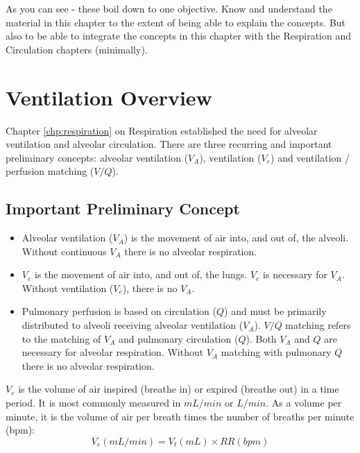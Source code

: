 As you can see - these boil down to one objective. Know and understand the material in this chapter to the extent of being able to explain the concepts. But also to be able to integrate the concepts in this chapter with the Respiration and Circulation chapters (minimally).

\section{Ventilation Overview}

Chapter \ref{chp:respiration} on Respiration established the need for alveolar ventilation and alveolar circulation. There are three recurring and important preliminary concepts: alveolar ventilation ($V_A$), ventilation ($V_e$) and ventilation / perfusion matching ($V/Q$).

\subsection{Important Preliminary Concept}

\begin{itemize}
    \item Alveolar ventilation ($V_A$) is the movement of air into, and out of, the alveoli. Without continuous $V_A$ there is no alveolar respiration. 
    \item $V_e$ is the movement of air into, and out of, the lungs. $V_e$ is necessary for $V_A$. Without ventilation ($V_e$), there is no $V_A$. \item Pulmonary perfusion is based on circulation ($Q$) and must be primarily distributed to alveoli receiving alveolar ventilation ($V_A$). $V/Q$ matching refers to the matching of $V_A$ and pulmonary circulation ($Q$). Both $V_A$ and $Q$ are necessary for alveolar respiration. Without $V_A$ matching with pulmonary $Q$ there is no alveolar respiration.
 \end{itemize}

$V_e$ is the volume of air inspired (breathe in) or expired (breathe out) in a time period. It is most commonly measured in $mL/min$ or $L/min$. As a volume per minute, it is the volume of air per breath times the number of breaths per minute (bpm):
\vspace{3mm}
\begin{equation}
    V_e (mL/min) = V_t (mL) \times RR (bpm)
    \label{Ve}
\end{equation}
\vspace{3mm}

